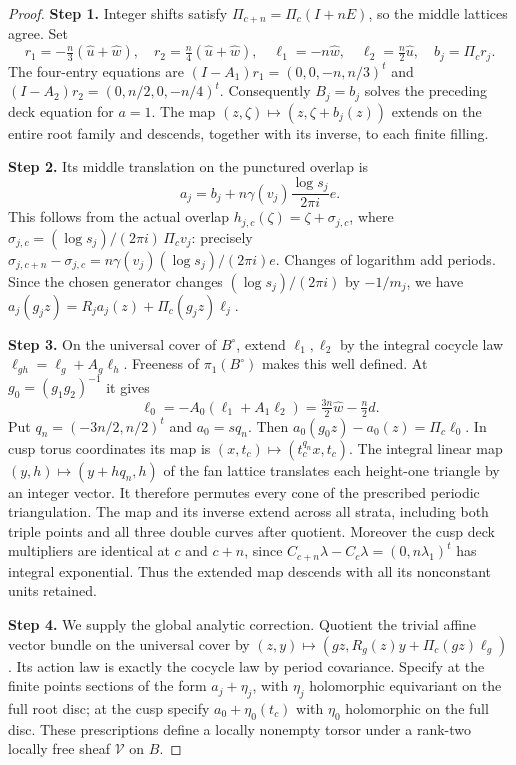 \documentclass[11pt,a4paper]{article}
\theoremstyle{plain}
\theoremstyle{definition}
\begin{document}
\begin{proof}
\par\smallskip\noindent\textbf{Step 1.} Integer shifts satisfy $\Pi_{c+n}=\Pi_c(I+nE)$, so the middle lattices agree. Set
\[
 r_1=-\tfrac n3(\widehat u+\widehat w),\quad
 r_2=\tfrac n4(\widehat u+\widehat w),\quad
 \ell_1=-n\widehat w,\quad \ell_2=\tfrac n2\widehat u,\quad b_j=\Pi_cr_j.
\]
The four-entry equations are $(I-A_1)r_1=(0,0,-n,n/3)^t$ and $(I-A_2)r_2=(0,n/2,0,-n/4)^t$. Consequently $B_j=b_j$ solves the preceding deck equation for $a=1$. The map $(z,\zeta)\mapsto(z,\zeta+b_j(z))$ extends on the entire root family and descends, together with its inverse, to each finite filling.

\par\smallskip\noindent\textbf{Step 2.} Its middle translation on the punctured overlap is
\[
 a_j=b_j+n\gamma(v_j)\frac{\log s_j}{2\pi i}e.
\]
This follows from the actual overlap $h_{j,c}(\zeta)=\zeta+\sigma_{j,c}$, where $\sigma_{j,c}=(\log s_j)/(2\pi i)\,\Pi_cv_j$: precisely $\sigma_{j,c+n}-\sigma_{j,c}=n\gamma(v_j)(\log s_j)/(2\pi i)e$. Changes of logarithm add periods. Since the chosen generator changes $(\log s_j)/(2\pi i)$ by $-1/m_j$, we have $a_j(g_jz)=R_ja_j(z)+\Pi_c(g_jz)\ell_j$.

\par\smallskip\noindent\textbf{Step 3.} On the universal cover of $B^\circ$, extend $\ell_1,\ell_2$ by the integral cocycle law $\ell_{gh}=\ell_g+A_g\ell_h$. Freeness of $\pi_1(B^\circ)$ makes this well defined. At $g_0=(g_1g_2)^{-1}$ it gives
\[
 \ell_0=-A_0(\ell_1+A_1\ell_2)=\tfrac{3n}2\widehat w-\tfrac n2d.
\]
Put $q_n=(-3n/2,n/2)^t$ and $a_0=sq_n$. Then $a_0(g_0z)-a_0(z)=\Pi_c\ell_0$. In cusp torus coordinates its map is $(x,t_c)\mapsto(t_c^{q_n}x,t_c)$. The integral linear map $(y,h)\mapsto(y+hq_n,h)$ of the fan lattice translates each height-one triangle by an integer vector. It therefore permutes every cone of the prescribed periodic triangulation. The map and its inverse extend across all strata, including both triple points and all three double curves after quotient. Moreover the cusp deck multipliers are identical at $c$ and $c+n$, since $C_{c+n}\lambda-C_c\lambda=(0,n\lambda_1)^t$ has integral exponential. Thus the extended map descends with all its nonconstant units retained.

\par\smallskip\noindent\textbf{Step 4.} We supply the global analytic correction. Quotient the trivial affine vector bundle on the universal cover by
$(z,y)\mapsto(gz,R_g(z)y+\Pi_c(gz)\ell_g)$. Its action law is exactly the cocycle law by period covariance. Specify at the finite points sections of the form $a_j+\eta_j$, with $\eta_j$ holomorphic equivariant on the full root disc; at the cusp specify $a_0+\eta_0(t_c)$ with $\eta_0$ holomorphic on the full disc. These prescriptions define a locally nonempty torsor under a rank-two locally free sheaf $\mathcal V$ on $B$.


\end{proof}
\end{document}
